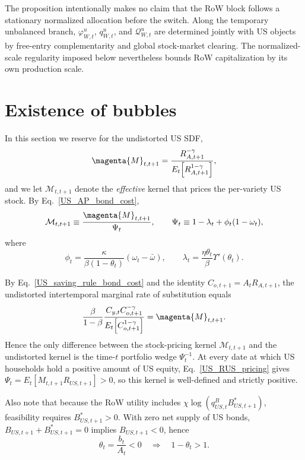 \documentclass{article}
\def\green#1{#1}%
\begin{document}
The proposition intentionally makes no claim that the RoW block follows a stationary normalized allocation before the switch. Along the temporary unbalanced branch, $\varphi_{W,t}^u$, $q_{W,t}^u$, and $\mathcal Q_{W,t}^u$ are determined jointly with US objects by \green{free-entry complementarity} and global stock-market clearing.  \green{The normalized-scale regularity imposed below nevertheless bounds RoW} capitalization \green{by} its own production scale.

\section{Existence of bubbles}\label{sec:existence_of_bubbles}

In this section we reserve  for the undistorted US SDF,
\[
\magenta{M}_{t,t+1}
=
\frac{R_{A,t+1}^{-\gamma}}{E_t\!\left[R_{A,t+1}^{1-\gamma}\right]},
\]
and we let $\mathcal M_{t,t+1}$ denote the \emph{effective} kernel that prices the per-variety US stock. By Eq.~\eqref{US_AP_bond_cost},
\begin{equation}\label{effective_US_kernel}
\mathcal M_{t,t+1}
\equiv
\frac{\magenta{M}_{t,t+1}}{\Psi_t},
\qquad
\Psi_t
\equiv
1-\lambda_t+\phi_t(1-\omega_t),
\end{equation}
where
\[
\phi_t=\frac{\kappa}{\beta(1-\theta_t)}(\omega_t-\bar\omega),
\qquad
\lambda_t=\frac{\eta\theta_t}{\beta}\Upsilon'(\theta_t).
\]

By Eq.~\eqref{US_saving_rule_bond_cost} and the identity $C_{o,t+1}=A_tR_{A,t+1}$, the undistorted intertemporal marginal rate of substitution equals
\[
\frac{\beta}{1-\beta}
\frac{C_{y,t}C_{o,t+1}^{-\gamma}}{E_t\!\left[C_{o,t+1}^{1-\gamma}\right]}
=
\magenta{M}_{t,t+1}.
\]
Hence the only difference between the stock-pricing kernel $\mathcal M_{t,t+1}$ and the undistorted kernel  is the time-$t$ portfolio wedge $\Psi_t^{-1}$.
\green{At every date at which US households hold a positive amount of US equity}, \green{Eq}.~\green{\eqref{US_RUS_pricing} gives} $\Psi_t\green{=E}_\green{t}[\green{M}_{\green{t},\green{t+1}}\green{R}_{\green{US},\green{t+1}}]>0$, \green{so this kernel is well-defined and strictly positive}.

Also note that because the RoW utility includes $\chi\log(q^B_{US,t}B^*_{US,t+1})$, feasibility requires $B^*_{US,t+1}>0$. With zero net supply of US bonds, $B_{US,t+1}+B^*_{US,t+1}=0$ implies $B_{US,t+1}<0$, hence
\begin{equation}\label{theta_nonpos}
\theta_t=\frac{b_t}{A_t}<0
\quad\Rightarrow\quad
1-\theta_t>1.
\end{equation}
\end{document}

